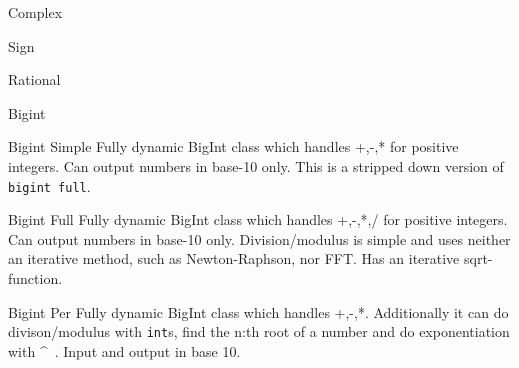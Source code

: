 
\begin{algorithm}{Complex}
\end{algorithm}

\begin{algorithm}{Sign}
\end{algorithm}

\begin{algorithm}{Rational}
\end{algorithm}

\begin{algorithm}{Bigint}
\end{algorithm}

\begin{algorithm}{Bigint Simple}
\desc
Fully dynamic BigInt class which handles +,-,* for
positive integers. Can output numbers in base-10 only. This is a stripped
down version of {\tt bigint full}.
\end{algorithm}

\begin{algorithm}{Bigint Full}
\desc
Fully dynamic BigInt class which handles +,-,*,/ for
positive integers. Can output numbers in base-10 only. Division/modulus is
simple and uses neither an iterative method, such as Newton-Raphson,
nor FFT. Has an iterative sqrt-function.
\end{algorithm}

\begin{algorithm}{Bigint Per}
\desc
Fully dynamic BigInt class which handles +,-,*. Additionally it can do
divison/modulus with \texttt{int}s, find the n:th root of a number and
do exponentiation with \^~. Input and output in base 10.
\end{algorithm}


